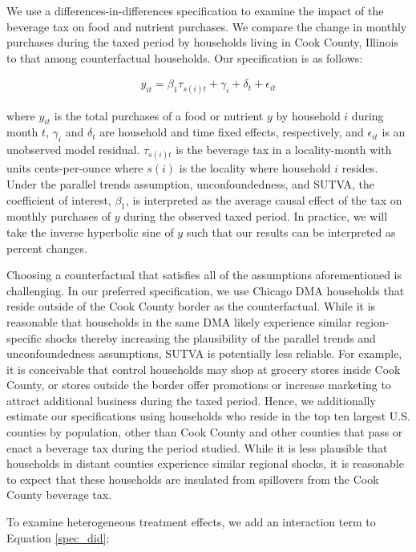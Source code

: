 \documentclass[12pt]{article}
\begin{document}
We use a differences-in-differences specification to examine the impact of the beverage tax on food and nutrient purchases. We compare the change in monthly purchases during the taxed period by households living in Cook County, Illinois to that among counterfactual households. Our specification is as follows:

\begin{align}
	y_{it} = \beta_1 \tau_{s(i)t} + \gamma_i + \delta_t + \epsilon_{it} \label{spec_did}
\end{align}

where $y_{it}$ is the total purchases of a food or nutrient $y$ by household $i$ during month $t$, $\gamma_i$ and $\delta_t$ are household and time fixed effects, respectively, and $\epsilon_{it}$ is an unobserved model residual. $\tau_{s(i)t}$ is the beverage tax in a locality-month with units cents-per-ounce where $s(i)$ is the locality where household $i$ resides. Under the parallel trends assumption, unconfoundedness, and SUTVA, the coefficient of interest, $\beta_1$, is interpreted as the average causal effect of the tax on monthly purchases of $y$ during the observed taxed period. In practice, we will take the inverse hyperbolic sine of $y$ such that our results can be interpreted as percent changes.

Choosing a counterfactual that satisfies all of the assumptions aforementioned is challenging. In our preferred specification, we use Chicago DMA households that reside outside of the Cook County border as the counterfactual. While it is reasonable that households in the same DMA likely experience similar region-specific shocks thereby increasing the plausibility of the parallel trends and unconfoundedness assumptions, SUTVA is potentially less reliable. For example, it is conceivable that control households may shop at grocery stores inside Cook County, or stores outside the border offer promotions or increase marketing to attract additional business during the taxed period. Hence, we additionally estimate our specifications using households who reside in the top ten largest U.S. counties by population, other than Cook County and other counties that pass or enact a beverage tax during the period studied. While it is less plausible that households in distant counties experience similar regional shocks, it is reasonable to expect that these households are insulated from spillovers from the Cook County beverage tax.

To examine heterogeneous treatment effects, we add an interaction term to Equation \ref{spec_did}:
\end{document}
